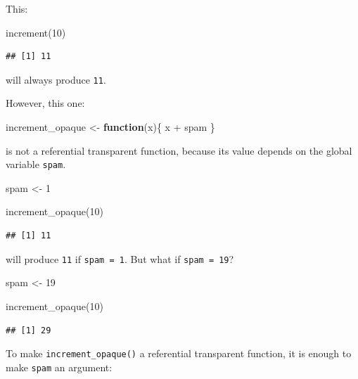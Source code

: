 \documentclass[
]{article}
\newenvironment{Shaded}{\begin{snugshade}}{\end{snugshade}}
\newcommand{\ControlFlowTok}[1]{\textcolor[rgb]{0.13,0.29,0.53}{\textbf{#1}}}
\newcommand{\DecValTok}[1]{\textcolor[rgb]{0.00,0.00,0.81}{#1}}
\newcommand{\FunctionTok}[1]{\textcolor[rgb]{0.00,0.00,0.00}{#1}}
\newcommand{\NormalTok}[1]{#1}
\newcommand{\OtherTok}[1]{\textcolor[rgb]{0.56,0.35,0.01}{#1}}
\newcommand{\SpecialCharTok}[1]{\textcolor[rgb]{0.00,0.00,0.00}{#1}}
\begin{document}
This:

\begin{Shaded}
\begin{Highlighting}[]
\FunctionTok{increment}\NormalTok{(}\DecValTok{10}\NormalTok{)}
\end{Highlighting}
\end{Shaded}

\begin{verbatim}
## [1] 11
\end{verbatim}

will always produce \texttt{11}.

However, this one:

\begin{Shaded}
\begin{Highlighting}[]
\NormalTok{increment\_opaque }\OtherTok{\textless{}{-}} \ControlFlowTok{function}\NormalTok{(x)\{}
\NormalTok{    x }\SpecialCharTok{+}\NormalTok{ spam}
\NormalTok{\}}
\end{Highlighting}
\end{Shaded}

is not a referential transparent function, because its value depends on the global variable \texttt{spam}.

\begin{Shaded}
\begin{Highlighting}[]
\NormalTok{spam }\OtherTok{\textless{}{-}} \DecValTok{1}

\FunctionTok{increment\_opaque}\NormalTok{(}\DecValTok{10}\NormalTok{)}
\end{Highlighting}
\end{Shaded}

\begin{verbatim}
## [1] 11
\end{verbatim}

will produce \texttt{11} if \texttt{spam\ =\ 1}. But what if \texttt{spam\ =\ 19}?

\begin{Shaded}
\begin{Highlighting}[]
\NormalTok{spam }\OtherTok{\textless{}{-}} \DecValTok{19}

\FunctionTok{increment\_opaque}\NormalTok{(}\DecValTok{10}\NormalTok{)}
\end{Highlighting}
\end{Shaded}

\begin{verbatim}
## [1] 29
\end{verbatim}

To make \texttt{increment\_opaque()} a referential transparent function, it is enough to make \texttt{spam} an
argument:
\end{document}
